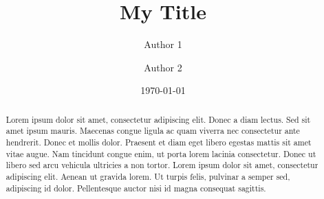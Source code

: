 \documentclass{article}
\title{My Title}
\author{Author 1 \and Author 2}
\date{\today}
\begin{document}
\maketitle

\begin{abstract}
    Lorem ipsum dolor sit amet, consectetur adipiscing elit. Donec a diam lectus. Sed sit amet ipsum mauris. Maecenas congue ligula ac quam viverra nec consectetur ante hendrerit. Donec et mollis dolor. Praesent et diam eget libero egestas mattis sit amet vitae augue. Nam tincidunt congue enim, ut porta lorem lacinia consectetur. Donec ut libero sed arcu vehicula ultricies a non tortor. Lorem ipsum dolor sit amet, consectetur adipiscing elit. Aenean ut gravida lorem. Ut turpis felis, pulvinar a semper sed, adipiscing id dolor. Pellentesque auctor nisi id magna consequat sagittis.
\end{abstract}

\tableofcontents

\listoffigures

\listoftables

\listoftodos

 \clearpage



\end{document}
